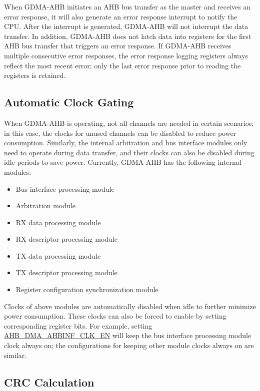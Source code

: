 \documentclass[main\_\_EN.tex]{subfiles}
\begin{document}
{    When GDMA-AHB initiates an AHB bus transfer as the master and receives an error response, it will also generate an error response interrupt to notify the CPU. After the interrupt is generated, GDMA-AHB will not interrupt the data transfer. In addition, GDMA-AHB does not latch data into registers for the first AHB bus transfer that triggers an error response. If GDMA-AHB receives multiple consecutive error responses, the error response logging registers always reflect the most recent error; only the last error response prior to reading the registers is retained.

    \subsection{Automatic Clock Gating}\label{sec:dma-auto-clk-gating}

    When GDMA-AHB is operating, not all channels are needed in certain scenarios; in this case, the clocks for unused channels can be disabled to reduce power consumption. Similarly, the internal arbitration and bus interface modules only need to operate during data transfer, and their clocks can also be disabled during idle periods to save power. Currently, GDMA-AHB has the following internal modules:
    \begin{itemize}
        \item Bus interface processing module
        \item Arbitration module
        \item RX data processing module
        \item RX descriptor processing module
        \item TX data processing module
        \item TX descriptor processing module
        \item Register configuration synchronization module
    \end{itemize}

    Clocks of above modules are automatically disabled when idle to further minimize power consumption. These clocks can also be forced to enable by setting corresponding register bits. For example, setting \hyperref[fielddesc:AHBDMAAHBINFCLKEN]{AHB\_DMA\_AHBINF\_CLK\_EN} will keep the bus interface processing module clock always on; the configurations for keeping other module clocks always on are similar.
}

\subsection{CRC Calculation}\label{sec:dma-crc-func}
\end{document}
